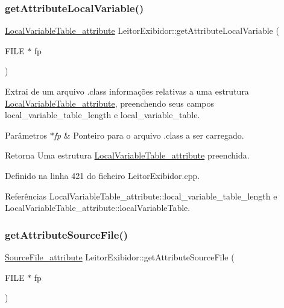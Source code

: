 \subsubsection{\texorpdfstring{get\+Attribute\+Local\+Variable()}{getAttributeLocalVariable()}}
{\footnotesize\ttfamily \hyperlink{structLocalVariableTable__attribute}{Local\+Variable\+Table\+\_\+attribute} Leitor\+Exibidor\+::get\+Attribute\+Local\+Variable (\begin{DoxyParamCaption}\item[{F\+I\+LE $\ast$}]{fp }\end{DoxyParamCaption})\hspace{0.3cm}{\ttfamily [private]}}

Extrai de um arquivo .class informações relativas a uma estrutura \hyperlink{structLocalVariableTable__attribute}{Local\+Variable\+Table\+\_\+attribute}, preenchendo seus campos local\+\_\+variable\+\_\+table\+\_\+length e local\+\_\+variable\+\_\+table. 
\begin{DoxyParams}{Parâmetros}
{\em $\ast$fp} & Ponteiro para o arquivo .class a ser carregado. \\
\hline
\end{DoxyParams}
\begin{DoxyReturn}{Retorna}
Uma estrutura \hyperlink{structLocalVariableTable__attribute}{Local\+Variable\+Table\+\_\+attribute} preenchida. 
\end{DoxyReturn}


Definido na linha 421 do ficheiro Leitor\+Exibidor.\+cpp.



Referências Local\+Variable\+Table\+\_\+attribute\+::local\+\_\+variable\+\_\+table\+\_\+length e Local\+Variable\+Table\+\_\+attribute\+::local\+Variable\+Table.

\mbox{\label{classLeitorExibidor_a265f56dc5c7eb8cfc9471435735c2145}} 
\subsubsection{\texorpdfstring{get\+Attribute\+Source\+File()}{getAttributeSourceFile()}}
{\footnotesize\ttfamily \hyperlink{structSourceFile__attribute}{Source\+File\+\_\+attribute} Leitor\+Exibidor\+::get\+Attribute\+Source\+File (\begin{DoxyParamCaption}\item[{F\+I\+LE $\ast$}]{fp }\end{DoxyParamCaption})\hspace{0.3cm}{\ttfamily [private]}}


